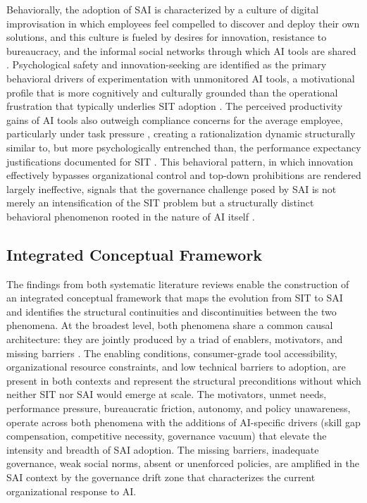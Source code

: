 \documentclass[12pt,oneside]{article}
\begin{document}
Behaviorally, the adoption of \ac{SAI} is characterized by a culture of digital improvisation in which employees feel compelled to discover and deploy their own solutions, and this culture is fueled by desires for innovation, resistance to bureaucracy, and the informal social networks through which \ac{AI} tools are shared \citep[1, 3]{ross2025shadowai}. Psychological safety and innovation-seeking are identified as the primary behavioral drivers of experimentation with unmonitored \ac{AI} tools, a motivational profile that is more cognitively and culturally grounded than the operational frustration that typically underlies \ac{SIT} adoption \citep[1138]{raizada2026shadowai}. The perceived productivity gains of \ac{AI} tools also outweigh compliance concerns for the average employee, particularly under task pressure \citep[1136, 1140]{raizada2026shadowai}, creating a rationalization dynamic structurally similar to, but more psychologically entrenched than, the performance expectancy justifications documented for \ac{SIT} \citep[505]{nguyen2024understanding}. This behavioral pattern, in which innovation effectively bypasses organizational control and top-down prohibitions are rendered largely ineffective, signals that the governance challenge posed by \ac{SAI} is not merely an intensification of the \ac{SIT} problem but a structurally distinct behavioral phenomenon rooted in the nature of \ac{AI} itself \citep[1136]{raizada2026shadowai}.

\subsection{Integrated Conceptual Framework} \label{integrated-conceptual-framework}

The findings from both systematic literature reviews enable the construction of an integrated conceptual framework that maps the evolution from \ac{SIT} to \ac{SAI} and identifies the structural continuities and discontinuities between the two phenomena. At the broadest level, both phenomena share a common causal architecture: they are jointly produced by a triad of enablers, motivators, and missing barriers \citep[22]{klotz2019causing}. The enabling conditions, consumer-grade tool accessibility, organizational resource constraints, and low technical barriers to adoption, are present in both contexts and represent the structural preconditions without which neither \ac{SIT} nor \ac{SAI} would emerge at scale. The motivators, unmet needs, performance pressure, bureaucratic friction, autonomy, and policy unawareness, operate across both phenomena with the additions of \ac{AI}-specific drivers (skill gap compensation, competitive necessity, governance vacuum) that elevate the intensity and breadth of \ac{SAI} adoption. The missing barriers, inadequate governance, weak social norms, absent or unenforced policies, are amplified in the \ac{SAI} context by the governance drift zone that characterizes the current organizational response to \ac{AI}.
\end{document}
